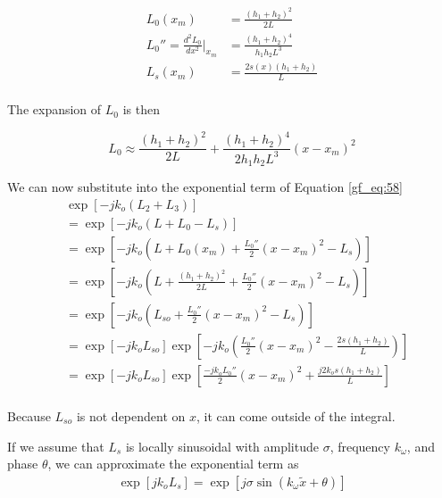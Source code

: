\begin{equation}
\begin{aligned}
L_0(x_m) &= \frac{(h_1+h_2)^2}{2L} \\
L_0''=\frac{d^2L_0}{dx^2}\bigg|_{x_m}  &= \frac{(h_1+h_2)^4}{h_1h_2L^3} \\
L_s(x_m) &= \frac{2s(x)(h_1 + h_2)}{L}\\
\end{aligned}
\label{gf_eq:65}
\end{equation}
\renewcommand{\baselinestretch}{2} \small\normalsize

\noindent The expansion of $L_0$ is then

\begin{equation}
L_0 \approx \frac{(h_1+h_2)^2}{2L} + \frac{(h_1+h_2)^4}{2h_1h_2L^3}(x-x_m)^2
\label{gf_eq:66}
\end{equation}
\renewcommand{\baselinestretch}{2} \small\normalsize

\noindent We can now substitute into the exponential term of Equation \ref{gf_eq:58}
\begin{equation}
\begin{aligned}
&\exp\left[-jk_o\left( L_2 + L_3\right) \right] \\
&= \exp\left[-jk_o\left( L+L_0-L_s\right) \right]\\
&= \exp\left[-jk_o\left( L+L_0(x_m) + \frac{L_0''}{2}(x-x_m)^2-L_s\right) \right]\\
&= \exp\left[-jk_o\left( L+\frac{(h_1+h_2)^2}{2L} + \frac{L_0''}{2}(x-x_m)^2-L_s\right)\right]\\
&=\exp\left[-jk_o\left(L_{so}+\frac{L_0''}{2}(x-x_m)^2-L_s\right)\right]\\
&=\exp\left[-jk_oL_{so}\right]\exp\left[-jk_o\left(\frac{L_0''}{2}(x-x_m)^2-\frac{2s(h_1+h_2)}{L}\right)\right]\\
&=\exp\left[-jk_oL_{so}\right]\exp\left[\frac{-jk_oL_0''}{2}(x-x_m)^2+\frac{j2k_os(h_1+h_2)}{L}\right]\\
\label{gf_eq:67}
\end{aligned}
\end{equation}
\renewcommand{\baselinestretch}{2} \small\normalsize

Because $L_{so}$ is not dependent on $x$, it can come outside of the integral.

If we assume that $L_s$ is locally sinusoidal with amplitude $\sigma$, frequency $k_{\omega}$, and phase $\theta$, we can approximate the exponential term as 
\begin{equation}
\begin{aligned}
\exp\left[jk_oL_s\right] =\exp\left[j\sigma \sin\left(k_{\omega} \tilde{x} + \theta\right) \right]
\end{aligned}
\label{gf_eq:68}
\end{equation}
\renewcommand{\baselinestretch}{2} \small\normalsize

